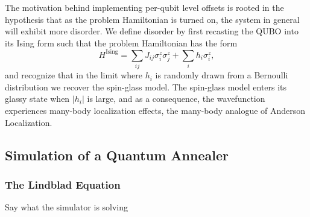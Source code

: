 \documentclass[prd,twocolumn,tightenlines,preprintnumbers,showpacs,superscriptaddress,notitlepage,nofootinbib,eqsecnum,floatfix,longbibliography]{revtex4}
\begin{document}
The motivation behind implementing per-qubit level offsets is rooted in the hypothesis that as the problem Hamiltonian is turned on, the system in general will exhibit more disorder.
We define disorder by first recasting the QUBO into its Ising form such that the problem Hamiltonian has the form
\begin{equation}
    H^{\textrm{Ising}} = \sum_{ij} J_{ij} \sigma^z_i \sigma^z_j + \sum_i h_i \sigma^z_i,
\end{equation}
and recognize that in the limit where $h_i$ is randomly drawn from a Bernoulli distribution we recover the spin-glass model.
The spin-glass model enters its glassy state when $|h_i|$ is large, and as a consequence, the wavefunction experiences many-body localization effects, the many-body analogue of Anderson Localization.


\subsection{Simulation of a Quantum Annealer}
\label{sec:methods:simulation}

\subsubsection{The Lindblad Equation}
\label{sec:methods:lindblad}
Say what the simulator is solving
\end{document}
